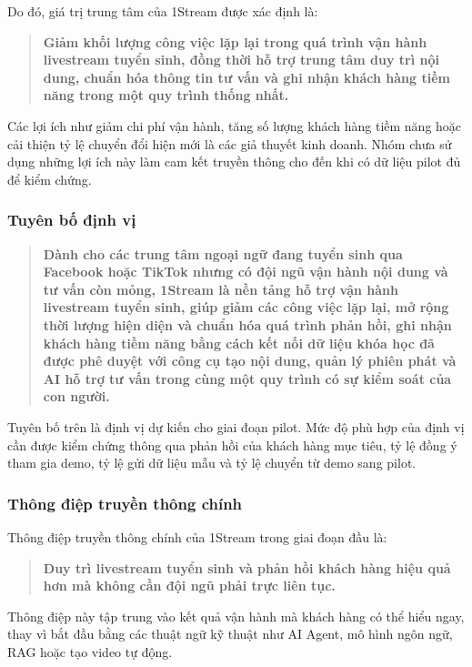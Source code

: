 Do đó, giá trị trung tâm của 1Stream được xác định là:

\begin{quote}
\textbf{Giảm khối lượng công việc lặp lại trong quá trình vận hành livestream tuyển sinh, đồng thời hỗ trợ trung tâm duy trì nội dung, chuẩn hóa thông tin tư vấn và ghi nhận khách hàng tiềm năng trong một quy trình thống nhất.}
\end{quote}

Các lợi ích như giảm chi phí vận hành, tăng số lượng khách hàng tiềm năng hoặc cải thiện tỷ lệ chuyển đổi hiện mới là các giả thuyết kinh doanh. Nhóm chưa sử dụng những lợi ích này làm cam kết truyền thông cho đến khi có dữ liệu pilot đủ để kiểm chứng.

\subsubsection{Tuyên bố định vị}

\begin{quote}
\textbf{Dành cho các trung tâm ngoại ngữ đang tuyển sinh qua Facebook hoặc TikTok nhưng có đội ngũ vận hành nội dung và tư vấn còn mỏng, 1Stream là nền tảng hỗ trợ vận hành livestream tuyển sinh, giúp giảm các công việc lặp lại, mở rộng thời lượng hiện diện và chuẩn hóa quá trình phản hồi, ghi nhận khách hàng tiềm năng bằng cách kết nối dữ liệu khóa học đã được phê duyệt với công cụ tạo nội dung, quản lý phiên phát và AI hỗ trợ tư vấn trong cùng một quy trình có sự kiểm soát của con người.}
\end{quote}

Tuyên bố trên là định vị dự kiến cho giai đoạn pilot. Mức độ phù hợp của định vị cần được kiểm chứng thông qua phản hồi của khách hàng mục tiêu, tỷ lệ đồng ý tham gia demo, tỷ lệ gửi dữ liệu mẫu và tỷ lệ chuyển từ demo sang pilot.

\subsubsection{Thông điệp truyền thông chính}

Thông điệp truyền thông chính của 1Stream trong giai đoạn đầu là:

\begin{quote}
\centering
\textbf{Duy trì livestream tuyển sinh và phản hồi khách hàng hiệu quả hơn mà không cần đội ngũ phải trực liên tục.}
\end{quote}

Thông điệp này tập trung vào kết quả vận hành mà khách hàng có thể hiểu ngay, thay vì bắt đầu bằng các thuật ngữ kỹ thuật như AI Agent, mô hình ngôn ngữ, RAG hoặc tạo video tự động.

